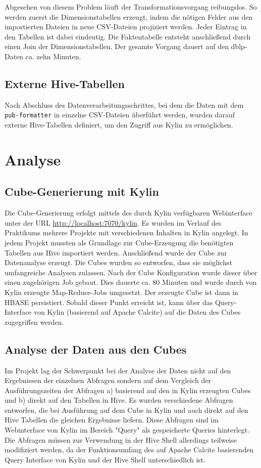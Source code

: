 \documentclass[a4paper,11pt,utf8]{scrartcl}
\begin{document}
Abgesehen von diesem Problem läuft der Transformationsvorgang reibungslos. So werden zuerst die Dimensionstabellen erzeugt, indem die nötigen Felder aus den importierten Dateien in neue CSV-Dateien projiziert werden. Jeder Eintrag in den Tabellen ist dabei eindeutig. Die Faktentabelle entsteht anschließend durch einen Join der Dimensionstabellen. Der gesamte Vorgang dauert auf den dblp-Daten ca. zehn Minuten.

\subsection{Externe Hive-Tabellen}

Nach Abschluss des Datenverarbeitungsschrittes, bei dem die Daten mit dem \texttt{pub-formatter} in einzelne CSV-Dateien überführt werden, wurden darauf externe Hive-Tabellen definiert, um den Zugriff aus Kylin zu ermöglichen.

\section{Analyse}
\label{sec:Analyse}

\subsection{Cube-Generierung mit Kylin}

Die Cube-Generierung erfolgt mittels des durch Kylin verfügbaren Webinterface unter der URL \url{http://localhost:7070/kylin}. Es wurden im Verlauf des Praktikums mehrere Projekte mit verschiedenen Inhalten in Kylin angelegt. In jedem Projekt mussten als Grundlage zur Cube-Erzeugung die benötigten Tabellen aus Hive importiert werden. Anschließend wurde der Cube zur Datenanalyse erzeugt. Die Cubes wurden so entworfen, dass sie möglichst umfangreiche Analysen zulassen. Nach der Cube Konfiguration wurde dieser über einen zugehörigen Job gebaut. Dies dauerte ca. 80 Minuten und wurde durch von Kylin erzeugte Map-Reduce-Jobs umgesetzt. Der erzeugte Cube ist dann in HBASE persistiert. Sobald dieser Punkt erreicht ist, kann über das Query-Interface von Kylin (basierend auf Apache Calcite) auf die Daten des Cubes zugegriffen werden. 

\subsection{Analyse der Daten aus den Cubes}

Im Projekt lag der Schwerpunkt bei der Analyse der Daten nicht auf den Ergebnissen der einzelnen Abfragen sondern auf dem Vergleich der Ausführungszeiten der Abfragen a) basierend auf den in Kylin erzeugten Cubes und b) direkt auf den Tabellen in Hive. Es wurden verschiedene Abfragen entworfen, die bei Ausführung auf dem Cube in Kylin und auch direkt auf den Hive Tabellen die gleichen Ergebnisse liefern. Diese Abfragen sind im Webinterface von Kylin im Bereich "Query" als \glqq gespeicherte Queries\grqq{} hinterlegt. Die Abfragen müssen zur Verwendung in der Hive Shell allerdings teilweise modifiziert werden, da der Funktionsumfang des auf Apache Calcite basierenden Query Interface von Kylin und der Hive Shell unterschiedlich ist.
\end{document}
